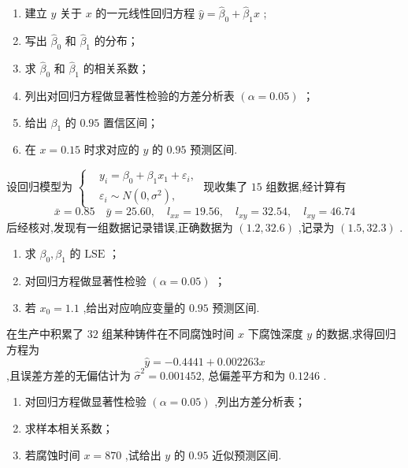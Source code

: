 \begin{xiti}
\begin{equation*}
    \end{equation*}
    \begin{enumerate}
        \item  建立 $y$ 关于 $x$ 的一元线性回归方程 $\hat{y}=\hat{\beta}_0+\hat{\beta}_1x$ ;
        \item 写出 $\hat{\beta}_0$ 和 $\hat{\beta}_1$ 的分布；
        \item 求 $\hat{\beta}_0$ 和 $\hat{\beta}_1$ 的相关系数；
        \item 列出对回归方程做显著性检验的方差分析表 $(\alpha=0.05)$ ；
        \item 给出 $\beta_1$ 的 $0.95$ 置信区间；
        \item 在 $x=0.15$ 时求对应的 $y$ 的 $0.95$ 预测区间.
    \end{enumerate}
    \item 设回归模型为 $\left\{\begin{aligned}
          & y_i=\beta_{0}+\beta_{1} x_{1}+\varepsilon_{i}, \\
          & \varepsilon_{i} \sim N\left(0,\sigma^2\right),
          \end{aligned}\right.$ 现收集了 $15$ 组数据,经计算有
    \begin{equation*}
    \bar{x}=0.85 \quad \bar{y}=25.60, \quad l_{x x}=19.56, \quad l_{x y}=32.54, \quad l_{x y}=46.74
    \end{equation*}
    后经核对,发现有一组数据记录错误,正确数据为 $(1.2,32.6)$ ,记录为 $(1.5,32.3)$ .
    \begin{enumerate}
        \item 求 $\beta_0,\beta_1$ 的 $\mathrm{LSE}$ ；
        \item 对回归方程做显著性检验 $(\alpha=0.05)$ ；
        \item 若 $x_0=1.1$ ,给出对应响应变量的 $0.95$ 预测区间.
    \end{enumerate}
    \item 在生产中积累了 $32$ 组某种铸件在不同腐蚀时间 $x$ 下腐蚀深度 $y$ 的数据,求得回归方程为
    \begin{equation*}
    \hat{y}=-0.4441+0.002263x
    \end{equation*}
    ,且误差方差的无偏估计为 $\hat{\sigma}^2=0.001452$, 总偏差平方和为 $0.1246$ .
    \begin{enumerate}
        \item 对回归方程做显著性检验 $(\alpha=0.05)$ ,列出方差分析表；
        \item 求样本相关系数；
        \item 若腐蚀时间 $x=870$ ,试给出 $y$ 的 $0.95$ 近似预测区间.

\end{enumerate}
\end{xiti}
